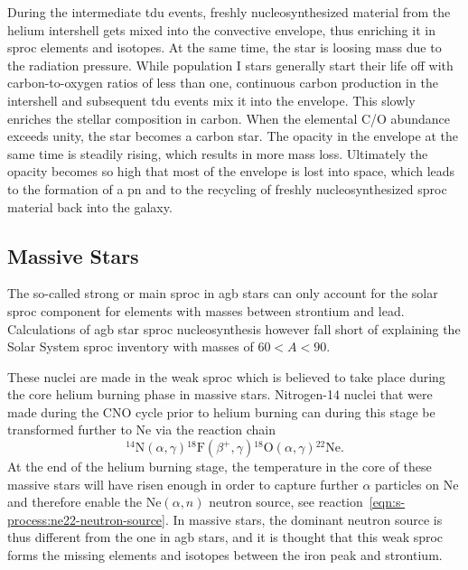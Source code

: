 During the intermediate \ac{tdu} events, freshly nucleosynthesized material from the helium intershell gets mixed into the convective envelope, thus enriching it in \ac{sproc} elements and isotopes. At the same time, the star is loosing mass due to the radiation pressure. While population I stars generally start their life off with carbon-to-oxygen ratios of less than one, continuous carbon production in the intershell and subsequent \ac{tdu} events mix it into the envelope. This slowly enriches the stellar composition in carbon. When the elemental C/O abundance exceeds unity, the star becomes a carbon star. The opacity in the envelope at the same time is steadily rising, which results in more mass loss. Ultimately the opacity becomes so high that most of the envelope is lost into space, which leads to the formation of a \ac{pn} and to the recycling of freshly nucleosynthesized \ac{sproc} material back into the galaxy.


\subsection{Massive Stars}

The so-called strong or main \ac{sproc} in \ac{agb} stars can only account for the solar \ac{sproc} component for elements with masses between strontium and lead. Calculations of \ac{agb} star \ac{sproc} nucleosynthesis however fall short of explaining the Solar System \ac{sproc} inventory with masses of $60 < A < 90$. 

These nuclei are made in the weak \ac{sproc} which is believed to take place during the core helium burning phase in massive stars. Nitrogen-14 nuclei that were made during the CNO cycle prior to helium burning can during this stage be transformed further to Ne via the reaction chain
\begin{equation}
    ^{14}\mathrm{N}(\alpha, \gamma){^{18}}\mathrm{F}(\beta^+, \gamma){^{18}}\mathrm{O}(\alpha, \gamma){^{22}}\mathrm{Ne}.
\end{equation}
At the end of the helium burning stage, the temperature in the core of these massive stars will have risen enough in order to capture further $\alpha$ particles on Ne and therefore enable the Ne$(\alpha, n)$ neutron source, see reaction~\eqref{eqn:s-process:ne22-neutron-source}. In massive stars, the dominant neutron source is thus different from the one in \ac{agb} stars, and it is thought that this weak \ac{sproc} forms the missing elements and isotopes between the iron peak and strontium.


